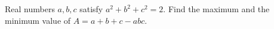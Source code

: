 Real numbers $a,b,c$ satisfy $a^2+b^2+c^2=2$. Find the maximum and the minimum value of $A=a+b+c-abc$.
